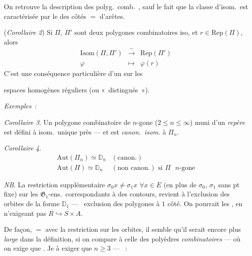 \documentclass[11pt,a4paper]{article}
\begin{document}

On retrouve la description des polyg.\ comb.\ , sauf le fait que la classe d'isom.\ est caractérisée par le \ill{} des côtés $=$ \ill{} d'arêtes.

(\emph{Corollaire 2}) Si $\Pi$, $\Pi'$ sont deux polygones combinatoires iso,  et $r \in \mathrm{Rep}(\Pi)$, alors
\[
  \begin{array}{rcl}
    \mathrm{Isom}(\Pi,\Pi') & \xrightarrow{\ \sim\ } & \mathrm{Rep}(\Pi') \\
    \varphi & \longmapsto & \varphi(r)
  \end{array}
\]
C'est une conséquence particulière d'un  sur les

espaces homogènes réguliers (ou «~distingués~»).

\emph{Exemples}~:

\emph{Corollaire 3}. Un polygone combinatoire de $n$-gone ($2 \leq n \leq \infty$) muni d'un \emph{repère} est défini à isom.\ unique près --- et est \emph{canon.\ isom.} à $\Pi_n$.

\emph{Corollaire 4}.
\[
  \begin{array}{ll}
    \mathrm{Aut}(\Pi_n) \simeq \mathbb{D}_n & (\text{canon.}) \\
    \mathrm{Aut}(\Pi) \simeq \mathbb{D}_n & (\text{non canon.}) \text{ si } \Pi \text{ $n$-gone}
  \end{array}
\]

\emph{NB}. La restriction supplémentaire $\sigma_0 x \neq \sigma_1 x$ $\forall x \in E$ (en plus de $\sigma_0$, $\sigma_1$ sans pt fixe) sur les $\mathfrak{G}_1$-ens.\ correspondants à des contours, \struck{\ill{}} revient à l'exclusion des orbites de la forme  $\mathbb{D}_1$ --- \ exclusion des polygones à $1$ côté. On pourrait les , en n'exigeant pas $R \hookrightarrow S \times A$.

De \ill{} façon, $=$ avec la restriction sur les orbites, il semble qu'il serait encore plus \emph{large} dans la définition, si on compare à celle des polyèdres \emph{combinatoires} --- où on exige que  \ill{} \ill{} \ill{} \ill{} \ill{}. Je     à exiger que \ill{} \ill{} $n \geq 3$ --- \ill{}~: \ill{}
\end{document}
